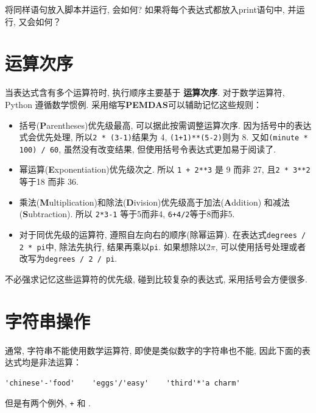\documentclass[10pt]{book}
\begin{document}
将同样语句放入脚本并运行, 会如何?
如果将每个表达式都放入print语句中, 并运行, 又会如何？


\section{运算次序}

当表达式含有多个运算符时, 执行顺序主要基于 {\bf 运算次序}. 
对于数学运算符, Python 遵循数学惯例. 
采用缩写{\bf PEMDAS}可以辅助记忆这些规则：

\begin{itemize}

\item 括号({\bf P}arentheses)优先级最高, 可以据此按需调整运算次序. 
因为括号中的表达式会优先处理, 所以{\tt 2 * (3-1)}结果为 4, {\tt (1+1)**(5-2)}则为 8. 
又如{\tt (minute * 100) / 60}, 
虽然没有改变结果, 但使用括号令表达式更加易于阅读了. 

\item 幂运算({\bf E}xponentiation)优先级次之. 所以
{\tt 1 + 2**3} 是 9 而非 27,  且{\tt 2 * 3**2} 等于18 而非 36. 

\item 乘法({\bf M}ultiplication)和除法({\bf D}ivision)优先级高于加法({\bf A}ddition)
和减法({\bf S}ubtraction). 所以 {\tt 2*3-1} 等于5而非4, {\tt 6+4/2}等于8而非5. 

\item 对于同优先级的运算符, 遵照自左向右的顺序(除幂运算). 
 在表达式{\tt degrees / 2 * pi}中, 除法先执行, 结果再乘以{\tt pi}. 
如果想除以$2 \pi$,  可以使用括号处理或者改写为{\tt degrees / 2 / pi}. 

\end{itemize}

不必强求记忆这些运算符的优先级, 碰到比较复杂的表达式, 采用括号会方便很多. 


\section{字符串操作}

通常, 字符串不能使用数学运算符, 即使是类似数字的字符串也不能, 
因此下面的表达式均是非法运算：

\begin{verbatim}
'chinese'-'food'    'eggs'/'easy'    'third'*'a charm'
\end{verbatim}
%

但是有两个例外,  {\tt +} 和 {\tt *}. 
\end{document}
